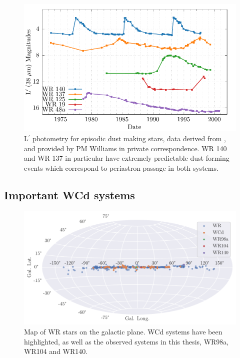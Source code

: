 \begin{figure}[h]
  \centering
  \includegraphics[]{assets/magnitudes/magnitudes.pdf}
  \caption[L$^\prime$ photometry of episodic dust making stars]{L$^\prime$ photometry for episodic dust making stars, data derived from \textcite{crowther_dust_2003}, and provided by PM Williams in private correspondence. WR 140 and WR 137 in particular have extremely predictable dust forming events which correspond to periastron passage in both systems.}
  \label{fig:periodicmags}
\end{figure}


\subsection{Important WCd systems}

\begin{figure}[h]
  \centering
  \includegraphics[width=\linewidth]{assets/galactic.pdf}
  \caption[Map of WR stars on the galactic plane]{Map of WR stars on the galactic plane. WCd systems have been highlighted, as well as the observed systems in this thesis, WR98a, WR104 and WR140.}
\end{figure}

